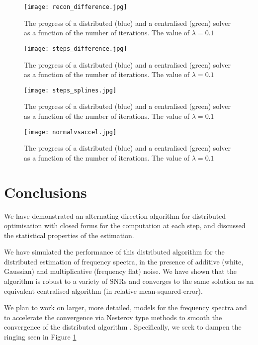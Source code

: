 \begin{figure}[h]
\centering
\texttt{[image: recon\_difference.jpg]}
\caption{The progress of a distributed (blue) and a centralised (green) solver as a function of the number of iterations. The value of \(\lambda = 0.1\)}
\label{fig:erroriterations}
\end{figure}

\begin{figure}[h]
\centering
\texttt{[image: steps\_difference.jpg]}
\caption{The progress of a distributed (blue) and a centralised (green) solver as a function of the number of iterations. The value of \(\lambda = 0.1\)}
\label{fig:steps_difference}
\end{figure}

\begin{figure}[h]
\centering
\texttt{[image: steps\_splines.jpg]}
\caption{The progress of a distributed (blue) and a centralised (green) solver as a function of the number of iterations. The value of \(\lambda = 0.1\)}
\label{fig:steps_splines}
\end{figure}

\begin{figure}[h]
\centering
\texttt{[image: normalvsaccel.jpg]}
\caption{The progress of a distributed (blue) and a centralised (green) solver as a function of the number of iterations. The value of \(\lambda = 0.1\)}
\label{fig:steps_splines}
\end{figure}

\section{Conclusions}
We have demonstrated an alternating direction algorithm for distributed optimisation with closed forms for the computation at each step, and discussed the statistical properties of the estimation. 

We have simulated the performance of this distributed algorithm for the distributed estimation of frequency spectra, in the presence of additive (white, Gaussian) and multiplicative (frequency flat) noise. We have shown that the algorithm is robust to a variety of SNRs and converges to the same solution as an equivalent centralised algorithm (in relative mean-squared-error).

We plan to work on larger, more detailed, models for the frequency spectra and to accelerate the convergence via Nesterov type methods to smooth the convergence of the distributed algorithm \cite{goldstein2014fast}. Specifically, we seek to dampen the ringing seen in Figure \ref{fig:erroriterations}
